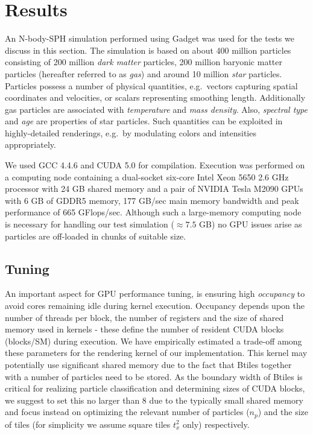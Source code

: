 \documentclass[smallextended]{svjour3}
\begin{document}
\section{Results}
\label{sec:results}

An N-body-SPH simulation performed using Gadget \cite{gadgeturl} was used for the tests we discuss in this section. The simulation is based on about 400 million particles consisting of 200 million {\it dark matter} particles, 200 million baryonic matter particles (hereafter referred to as {\it gas}) and around 10 million {\it star} particles. Particles possess a number of physical quantities, e.g.\ vectors capturing spatial coordinates and velocities, or scalars representing smoothing length. Additionally gas particles are associated with {\it temperature} and {\it mass density}. Also, {\it spectral type} and {\it age} are properties of star particles. Such quantities can be exploited in highly-detailed renderings, e.g.\ by modulating colors and intensities appropriately. 

We used GCC 4.4.6 and CUDA 5.0 for compilation. Execution was performed on a computing node containing a dual-socket six-core Intel Xeon 5650 2.6 GHz processor with 24 GB shared memory and a pair of NVIDIA Tesla M2090 GPUs with 6 GB of GDDR5 memory, 177 GB/sec main memory bandwidth and peak performance of 665 GFlops/sec. Although such a large-memory computing node is necessary for handling our test simulation ($\approx 7.5$ GB) no GPU issues arise as particles are off-loaded in chunks of suitable size. 

\subsection{Tuning}
\label{sec:gpuperf}
An important aspect for GPU performance tuning, is ensuring high {\it occupancy} to avoid cores remaining idle during kernel execution. Occupancy depends upon the number of threads per block, the number of registers and the size of shared memory used in kernels - these define the number of resident CUDA blocks (blocks/SM) during execution. We have empirically estimated a trade-off among these parameters for the rendering kernel of our implementation. This kernel may potentially use significant shared memory due to the fact that Btiles together with a number of particles need to be stored. As the boundary width of Btiles is critical for realizing particle classification and determining sizes of CUDA blocks, we suggest to set this no larger than 8 due to the typically small shared memory and focus instead on optimizing the relevant number of particles ($n_p$) and the size of tiles (for simplicity we assume square tiles $t_x^2$ only) respectively.
\end{document}
